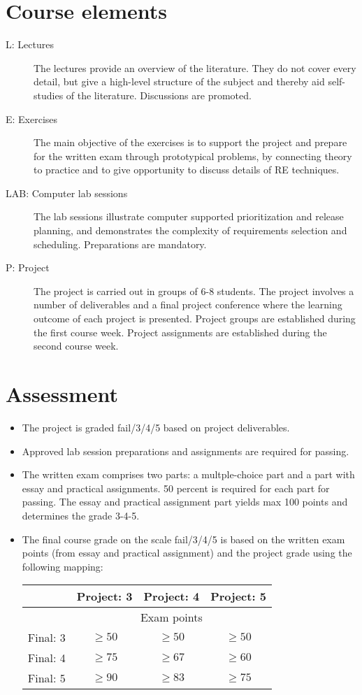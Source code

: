 \newpage

\section{Course elements}
\begin{description}
\item[L: Lectures] The lectures provide an overview of the literature. They do not cover every detail, but give a high-level structure of the subject and thereby aid self-studies of the literature. Discussions are promoted.
\item[E: Exercises] The main objective of the exercises is to support the project and prepare for the written exam through prototypical problems, by connecting theory to practice and to give opportunity to discuss details of RE techniques.
\item[LAB: Computer lab sessions] The lab sessions illustrate computer supported
prioritization and release planning, and demonstrates the complexity of requirements selection and scheduling. Preparations are mandatory. 
\item[P: Project] The project is carried out in groups of 6-8 students. The project involves a number of deliverables and a final project conference where the learning outcome of each project is presented. Project groups are established during the first course week. Project assignments are established during the second course week.
\end{description}




\section{Assessment}
\begin{itemize}
\item The project is graded fail/3/4/5 based on project deliverables.
\item Approved lab session preparations and assignments are required for passing.
\item The written exam comprises two parts: a multple-choice part and a part with essay and practical assignments. 50 percent is required for each part for passing. The essay and practical assignment part yields max 100 points and determines the grade 3-4-5.
\item The final course grade on the scale fail/3/4/5 is based on the written exam points (from essay and practical assignment) and the project grade using the following mapping: 

\begin{tabular}{r | c c c}
 & Project: 3 & Project: 4 & Project: 5 \\
\hline
 & \multicolumn{3}{c}{Exam points}    \\
Final: 3 & $ \geq 50$ & $\geq 50$ & $\geq 50$ \\
Final: 4 & $ \geq 75$ & $\geq 67$ & $\geq 60$ \\
Final: 5 & $ \geq 90$ & $\geq 83$ & $\geq 75$ \\
\hline
\end{tabular}


\end{itemize}


